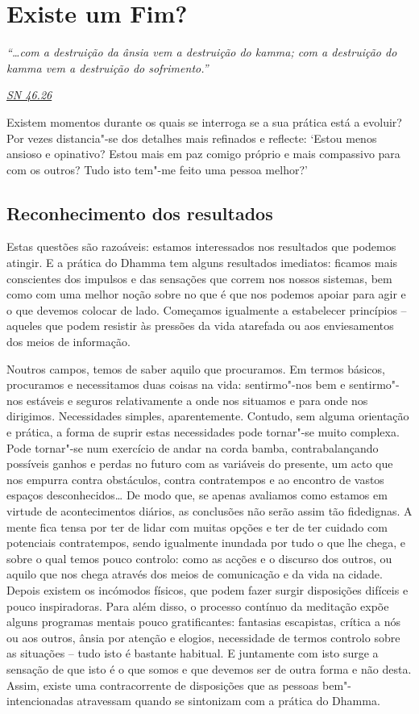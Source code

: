 \chapter{Existe um Fim?}

\emph{``\ldots{}com a destruição da ânsia vem a destruição do kamma; com a destruição do kamma vem a destruição do sofrimento.''}

\href{https://suttacentral.net/sn46.26/en/bodhi}{\emph{SN 46.26}}

Existem momentos durante os quais se interroga se a sua prática está a evoluir? Por vezes distancia"-se dos detalhes mais refinados e reflecte: `Estou menos ansioso e opinativo? Estou mais em paz comigo próprio e mais compassivo para com os outros? Tudo isto tem"-me feito uma pessoa melhor?'

\section{Reconhecimento dos resultados}

Estas questões são razoáveis: estamos interessados nos resultados que podemos atingir. E a prática do Dhamma tem alguns resultados imediatos: ficamos mais conscientes dos impulsos e das sensações que correm nos nossos sistemas, bem como com uma melhor noção sobre no que é que nos podemos apoiar para agir e o que devemos colocar de lado. Começamos igualmente a estabelecer princípios -- aqueles que podem resistir às pressões da vida atarefada ou aos enviesamentos dos meios de informação.

Noutros campos, temos de saber aquilo que procuramos. Em termos básicos, procuramos e necessitamos duas coisas na vida: sentirmo"-nos bem e sentirmo"-nos estáveis e seguros relativamente a onde nos situamos e para onde nos dirigimos. Necessidades simples, aparentemente. Contudo, sem alguma orientação e prática, a forma de suprir estas necessidades pode tornar"-se muito complexa. Pode tornar"-se num exercício de andar na corda bamba, contrabalançando possíveis ganhos e perdas no futuro com as variáveis do presente, um acto que nos empurra contra obstáculos, contra contratempos e ao encontro de vastos espaços desconhecidos\ldots{} De modo que, se apenas avaliamos como estamos em virtude de acontecimentos diários, as conclusões não serão assim tão fidedignas. A mente fica tensa por ter de lidar com muitas opções e ter de ter cuidado com potenciais contratempos, sendo igualmente inundada por tudo o que lhe chega, e sobre o qual temos pouco controlo: como as acções e o discurso dos outros, ou aquilo que nos chega através dos meios de comunicação e da vida na cidade. Depois existem os incómodos físicos, que podem fazer surgir disposições difíceis e pouco inspiradoras. Para além disso, o processo contínuo da meditação expõe alguns programas mentais pouco gratificantes: fantasias escapistas, crítica a nós ou aos outros, ânsia por atenção e elogios, necessidade de termos controlo sobre as situações -- tudo isto é bastante habitual. E juntamente com isto surge a sensação de que isto é o que somos e que devemos ser de outra forma e não desta. Assim, existe uma contracorrente de disposições que as pessoas bem"-intencionadas atravessam quando se sintonizam com a prática do Dhamma.

